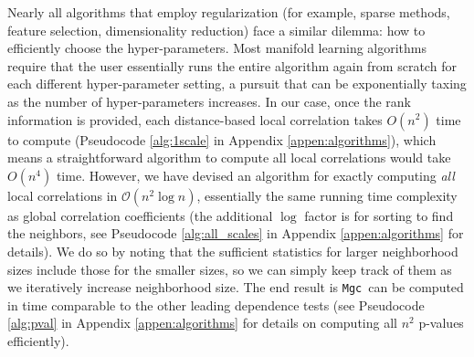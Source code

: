 \documentclass[11pt]{article}
\newcommand{\note}[2][]{\added[#1,remark={#2}]{}}
\providecommand{\sct}[1]{{\sc \texttt{#1}}}
\providecommand{\mc}[1]{\mathcal{#1}}
\newcommand{\Mgc}{\sct{Mgc}}
\newcommand{\jv}[1]{{\note{jv: #1}}}
\begin{document}


Nearly all algorithms that employ regularization (for example, sparse methods, feature selection, dimensionality reduction) face a similar dilemma: how to efficiently choose the hyper-parameters.
% 
\jv{Need to discuss the last two paragraphs in this section; and I have combined two running time paragraph into one.}
Most manifold learning algorithms require that the user essentially runs the entire algorithm again from scratch for each different hyper-parameter setting, a pursuit that can be exponentially taxing as the number of hyper-parameters increases.
In our case, once the rank information is provided, each distance-based local correlation takes $O(n^2)$ time to compute (Pseudocode \ref{alg:1scale} in Appendix \ref{appen:algorithms}), which means a straightforward algorithm to compute all local correlations would take $O(n^4)$ time.
% 
However, we have devised an algorithm for exactly computing \emph{all} local correlations in $\mc{O}(n^2 \log n)$, essentially the same running time complexity as  global correlation coefficients (the additional $\log$ factor is for sorting to find the neighbors, see Pseudocode \ref{alg:all_scales} in Appendix \ref{appen:algorithms} for details). We do so by noting that the sufficient statistics for larger neighborhood sizes include those for the smaller sizes, so we can simply keep track of them as we iteratively increase neighborhood size. The end result is \Mgc~can be computed in  time comparable to the other leading dependence tests (see Pseudocode \ref{alg:pval} in Appendix \ref{appen:algorithms} for details on computing all $n^2$ p-values efficiently).
% 
\end{document}

